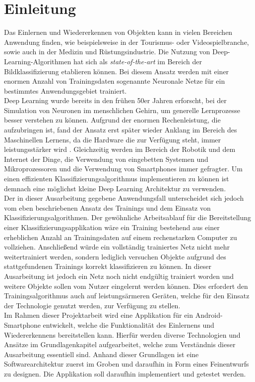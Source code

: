 \documentclass[oneside]{ausarbeitung}
\begin{document}
\cleardoublepage
{}
\setcounter{page}{1}

\chapter{Einleitung}
\label{cha:einleitung}
Das Einlernen und Wiedererkennen von Objekten kann in vielen Bereichen Anwendung finden, wie beispielsweise in der Tourismus- oder Videospielbranche, sowie auch in der Medizin und Rüstungsindustrie. Die Nutzung von Deep-Learning-Algorithmen hat sich als \textit{state-of-the-art} im Bereich der Bildklassifizierung etablieren können. Bei diesem Ansatz werden mit einer enormen Anzahl von Trainingsdaten sogenannte Neuronale Netze für ein bestimmtes Anwendungsgebiet trainiert.\\
Deep Learning wurde bereits in den frühen 50er Jahren erforscht, bei der Simulation von Neuronen im menschlichen Gehirn, um generelle Lernprozesse besser verstehen zu können. Aufgrund der enormen Rechenleistung, die aufzubringen ist, fand der Ansatz erst später wieder Anklang im Bereich des Maschinellen Lernens, da die Hardware die zur Verfügung steht, immer leistungsstärker wird \cite{dl-review}. Gleichzeitig werden im Bereich der Robotik und dem Internet der Dinge, die Verwendung von eingebetten Systemen und Mikroprozessoren und die Verwendung von Smartphones immer gefragter. Um einen effizienten Klassifizierungsalgorithmus implementieren zu können ist demnach eine möglichst kleine Deep Learning Architektur zu verwenden.\\
Der in dieser Ausarbeitung gegebene Anwendungsfall unterscheidet sich jedoch vom eben beschriebenen Ansatz des Trainings und dem Einsatz von Klassifizierungsalgorithmen. Der gewöhnliche Arbeitsablauf für die Bereitstellung einer Klassifizierungsapplikation wäre ein Training bestehend aus einer erheblichen Anzahl an Trainingsdaten auf einem rechenstarken Computer zu vollziehen. Anschließend würde ein vollständig trainiertes Netz nicht mehr weitertrainiert werden, sondern lediglich versuchen Objekte aufgrund des stattgefundenen Trainings korrekt klassifizieren zu können. In dieser Ausarbeitung ist jedoch ein Netz noch nicht endgültig trainiert worden und weitere Objekte sollen vom Nutzer eingelernt werden können. Dies erfordert den Trainingsalgorithmus auch auf leistungsärmeren Geräten, welche für den Einsatz der Technologie genutzt werden, zur Verfügung zu stellen.\\
Im Rahmen dieser Projektarbeit wird eine Applikation für ein Android-Smartphone entwickelt, welche die Funktionalität des Einlernens und Wiedererkennens bereitstellen kann. Hierfür werden diverse Technologien und Ansätze im Grundlagenkapitel aufgearbeitet, welche zum Verständnis dieser Ausarbeitung essentiell sind. Anhand dieser Grundlagen ist eine Softwarearchitektur zuerst im Groben und daraufhin in Form eines Feinentwurfs zu designen. Die Applikation soll daraufhin implementiert und getestet werden.
\end{document}
